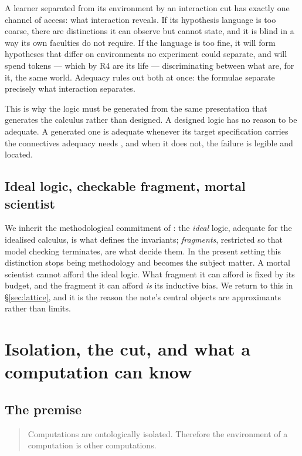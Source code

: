 \documentclass[11pt]{article}
\theoremstyle{plain}
\theoremstyle{definition}
\begin{document}
A learner separated from its environment by an interaction cut has exactly one channel of access: what
interaction reveals. If its hypothesis language is too coarse, there are distinctions it can observe
but cannot state, and it is blind in a way its own faculties do not require. If the language is too
fine, it will form hypotheses that differ on environments no experiment could separate, and will spend
tokens --- which by R4 are its life --- discriminating between what are, for it, the same world.
Adequacy rules out both at once: the formulae separate precisely what interaction separates.

This is why the logic must be generated from the same presentation that generates the calculus rather
than designed. A designed logic has no reason to be adequate. A generated one is adequate whenever its
target specification carries the connectives adequacy needs \cite[\S1.3]{ClassifierNote}, and when it
does not, the failure is legible and located.

\subsection{Ideal logic, checkable fragment, mortal scientist}

We inherit the methodological commitment of \cite{ClassifierNote}: the \emph{ideal} logic, adequate
for the idealised calculus, is what defines the invariants; \emph{fragments}, restricted so that model
checking terminates, are what decide them. In the present setting this distinction stops being
methodology and becomes the subject matter. A mortal scientist cannot afford the ideal logic. What
fragment it can afford is fixed by its budget, and the fragment it can afford \emph{is} its inductive
bias. We return to this in \S\ref{sec:lattice}, and it is the reason the note's central objects are
approximants rather than limits.

\section{Isolation, the cut, and what a computation can know}
\label{sec:cut}

\subsection{The premise}

\begin{quote}
Computations are ontologically isolated. Therefore the environment of a computation is other
computations.
\end{quote}
\end{document}
